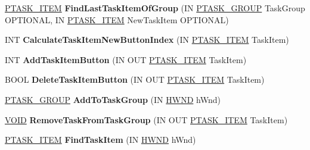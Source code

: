 \begin{DoxyCompactItemize}
\mbox{\label{class_c_task_switch_wnd_a6d457f0f917a21e96e2043c6a203506d}} 
\hyperlink{struct___t_a_s_k___i_t_e_m}{P\+T\+A\+S\+K\+\_\+\+I\+T\+EM} {\bfseries Find\+Last\+Task\+Item\+Of\+Group} (IN \hyperlink{struct___t_a_s_k___g_r_o_u_p}{P\+T\+A\+S\+K\+\_\+\+G\+R\+O\+UP} Task\+Group O\+P\+T\+I\+O\+N\+AL, IN \hyperlink{struct___t_a_s_k___i_t_e_m}{P\+T\+A\+S\+K\+\_\+\+I\+T\+EM} New\+Task\+Item O\+P\+T\+I\+O\+N\+AL)
\item 
\mbox{\label{class_c_task_switch_wnd_ae54ff8be20f9dbe65fa2a2a20c790c29}} 
I\+NT {\bfseries Calculate\+Task\+Item\+New\+Button\+Index} (IN \hyperlink{struct___t_a_s_k___i_t_e_m}{P\+T\+A\+S\+K\+\_\+\+I\+T\+EM} Task\+Item)
\item 
\mbox{\label{class_c_task_switch_wnd_a7742600e7bdb1b68a780f81b54666d7c}} 
I\+NT {\bfseries Add\+Task\+Item\+Button} (IN O\+UT \hyperlink{struct___t_a_s_k___i_t_e_m}{P\+T\+A\+S\+K\+\_\+\+I\+T\+EM} Task\+Item)
\item 
\mbox{\label{class_c_task_switch_wnd_aa199e2c35003c9ca7ca55c38426c37fd}} 
B\+O\+OL {\bfseries Delete\+Task\+Item\+Button} (IN O\+UT \hyperlink{struct___t_a_s_k___i_t_e_m}{P\+T\+A\+S\+K\+\_\+\+I\+T\+EM} Task\+Item)
\item 
\mbox{\label{class_c_task_switch_wnd_a329659a2798d5b6b656900272b5c7508}} 
\hyperlink{struct___t_a_s_k___g_r_o_u_p}{P\+T\+A\+S\+K\+\_\+\+G\+R\+O\+UP} {\bfseries Add\+To\+Task\+Group} (IN \hyperlink{interfacevoid}{H\+W\+ND} h\+Wnd)
\item 
\mbox{\label{class_c_task_switch_wnd_a67bd66774242363848840174c12bf63f}} 
\hyperlink{interfacevoid}{V\+O\+ID} {\bfseries Remove\+Task\+From\+Task\+Group} (IN O\+UT \hyperlink{struct___t_a_s_k___i_t_e_m}{P\+T\+A\+S\+K\+\_\+\+I\+T\+EM} Task\+Item)
\item 
\mbox{\label{class_c_task_switch_wnd_acdd5cd8a2fb42dd9e1bab16aafb64895}} 
\hyperlink{struct___t_a_s_k___i_t_e_m}{P\+T\+A\+S\+K\+\_\+\+I\+T\+EM} {\bfseries Find\+Task\+Item} (IN \hyperlink{interfacevoid}{H\+W\+ND} h\+Wnd)
\item 
\mbox{\label{class_c_task_switch_wnd_a1a416ca17200ad40108ca3772e3e9d7d}} 

\end{DoxyCompactItemize}
